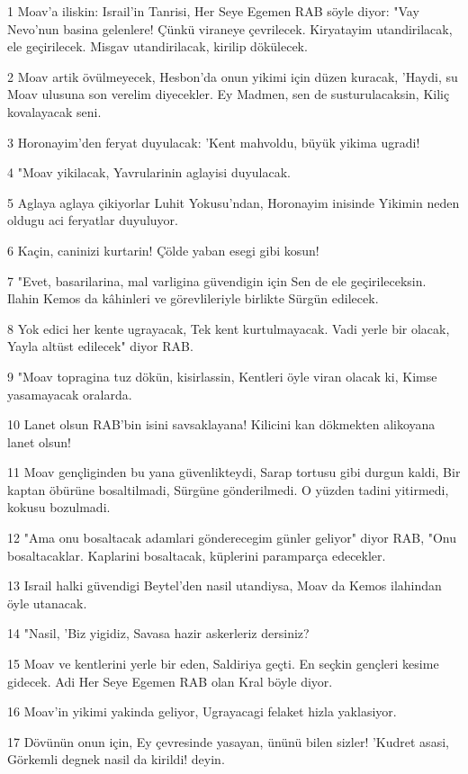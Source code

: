 \par 1 Moav'a iliskin: Israil'in Tanrisi, Her Seye Egemen RAB söyle diyor: "Vay Nevo'nun basina gelenlere! Çünkü viraneye çevrilecek. Kiryatayim utandirilacak, ele geçirilecek. Misgav utandirilacak, kirilip dökülecek.
\par 2 Moav artik övülmeyecek, Hesbon'da onun yikimi için düzen kuracak, 'Haydi, su Moav ulusuna son verelim diyecekler. Ey Madmen, sen de susturulacaksin, Kiliç kovalayacak seni.
\par 3 Horonayim'den feryat duyulacak: 'Kent mahvoldu, büyük yikima ugradi!
\par 4 "Moav yikilacak, Yavrularinin aglayisi duyulacak.
\par 5 Aglaya aglaya çikiyorlar Luhit Yokusu'ndan, Horonayim inisinde Yikimin neden oldugu aci feryatlar duyuluyor.
\par 6 Kaçin, caninizi kurtarin! Çölde yaban esegi gibi kosun!
\par 7 "Evet, basarilarina, mal varligina güvendigin için Sen de ele geçirileceksin. Ilahin Kemos da kâhinleri ve görevlileriyle birlikte Sürgün edilecek.
\par 8 Yok edici her kente ugrayacak, Tek kent kurtulmayacak. Vadi yerle bir olacak, Yayla altüst edilecek" diyor RAB.
\par 9 "Moav topragina tuz dökün, kisirlassin, Kentleri öyle viran olacak ki, Kimse yasamayacak oralarda.
\par 10 Lanet olsun RAB'bin isini savsaklayana! Kilicini kan dökmekten alikoyana lanet olsun!
\par 11 Moav gençliginden bu yana güvenlikteydi, Sarap tortusu gibi durgun kaldi, Bir kaptan öbürüne bosaltilmadi, Sürgüne gönderilmedi. O yüzden tadini yitirmedi, kokusu bozulmadi.
\par 12 "Ama onu bosaltacak adamlari gönderecegim günler geliyor" diyor RAB, "Onu bosaltacaklar. Kaplarini bosaltacak, küplerini paramparça edecekler.
\par 13 Israil halki güvendigi Beytel'den nasil utandiysa, Moav da Kemos ilahindan öyle utanacak.
\par 14 "Nasil, 'Biz yigidiz, Savasa hazir askerleriz dersiniz?
\par 15 Moav ve kentlerini yerle bir eden, Saldiriya geçti. En seçkin gençleri kesime gidecek. Adi Her Seye Egemen RAB olan Kral böyle diyor.
\par 16 Moav'in yikimi yakinda geliyor, Ugrayacagi felaket hizla yaklasiyor.
\par 17 Dövünün onun için, Ey çevresinde yasayan, ününü bilen sizler! 'Kudret asasi, Görkemli degnek nasil da kirildi! deyin.
